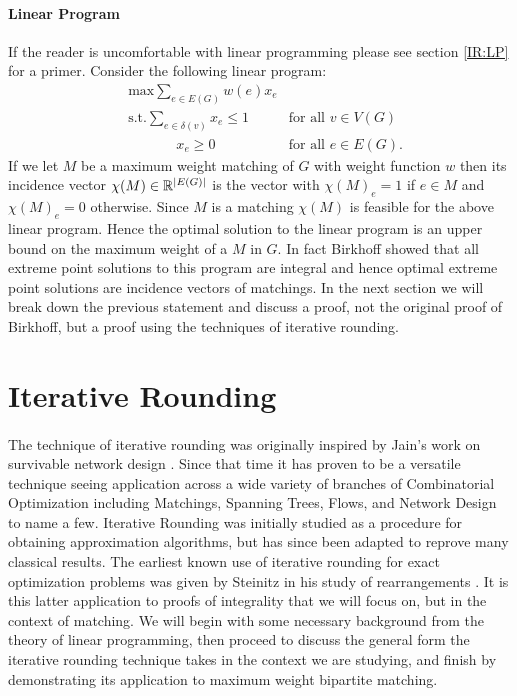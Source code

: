 \paragraph{Linear Program}
If the reader is uncomfortable with linear programming please see section \ref{IR:LP} for a primer. Consider the following linear program:
\begin{align*}
	&\text{max} \sum_{e \in E(G)} w(e) x_e \\
	&\text{s.t.} \sum_{e \in \delta(v)} x_e \leq 1 &\text{for all $v \in V(G)$} \\
	&\quad\quad\quad\ \ x_e \geq 0 &\text{for all $e \in E(G)$.}
\end{align*}
If we let $M$ be a maximum weight matching of $G$ with weight function $w$ then its incidence vector $\chi(M) \in \mathbb{R}^{|E(G)|}$ is the vector with $\chi(M)_e = 1$ if $e \in M$ and $\chi(M)_e = 0$ otherwise. Since $M$ is a matching $\chi(M)$ is feasible for the above linear program. Hence the optimal solution to the linear program is an upper bound on the maximum weight of a $M$ in $G$. In fact Birkhoff \cite{birkhoff1946tres} showed that all extreme point solutions to this program are integral and hence optimal extreme point solutions are incidence vectors of matchings. In the next section we will break down the previous statement and discuss a proof, not the original proof of Birkhoff, but a proof using the techniques of iterative rounding.
\section{Iterative Rounding}\label{IR}
\paragraph{}
The technique of iterative rounding was originally inspired by Jain's work on survivable network design \cite{jain2001factor}. Since that time it has proven to be a versatile technique seeing application across a wide variety of branches of Combinatorial Optimization including Matchings, Spanning Trees, Flows, and Network Design \cite{lau2011iterative} to name a few. Iterative Rounding was initially studied as a procedure for obtaining approximation algorithms, but has since been adapted to reprove many classical results. The earliest known use of iterative rounding for exact optimization problems was given by Steinitz in his study of rearrangements \cite{steinitz1913bedingt}. It is this latter application to proofs of integrality that we will focus on, but in the context of matching. We will begin with some necessary background from the theory of linear programming, then proceed to discuss the general form the iterative rounding technique takes in the context we are studying, and finish by demonstrating its application to maximum weight bipartite matching.
